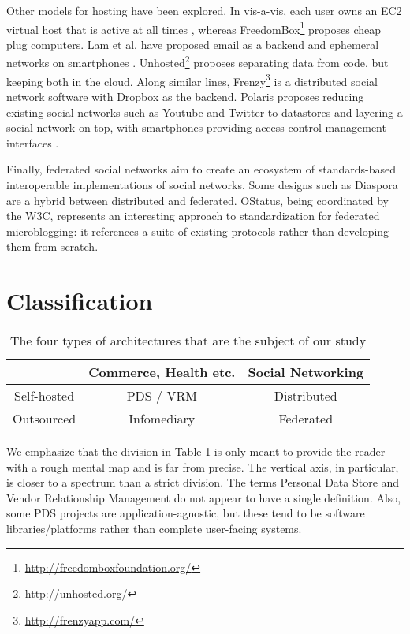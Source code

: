 \documentclass{acm_proc_article-sp}
\begin{document}
Other models for hosting have been explored. In vis-a-vis, each user owns an EC2 virtual host that is active at all times \cite{Shakimov_Lim_Li_Liu_Varshavsky_2011}, whereas FreedomBox\footnote{\url{http://freedomboxfoundation.org/}} proposes cheap plug computers. Lam et al. have proposed email as a backend \cite{Fischer_Lam_2011} and ephemeral networks on smartphones \cite{Dodson_Lam_2010}. Unhosted\footnote{\url{http://unhosted.org/}} proposes separating data from code, but keeping both in the cloud. Along similar lines, Frenzy\footnote{\url{http://frenzyapp.com/}} is a distributed social network software with Dropbox as the backend. Polaris proposes reducing existing social networks such as Youtube and Twitter to datastores and layering a social network on top, with smartphones providing access control management interfaces \cite{polaris}.

Finally, federated social networks aim to create an ecosystem of standards-based interoperable implementations of social networks. Some designs such as Diaspora are a hybrid between distributed and federated. OStatus, being coordinated by the W3C, represents an interesting approach to standardization for federated microblogging: it references a suite of existing protocols rather than developing them from scratch.


\section{Classification}
\label{sec:Classification}
\begin{table}[ht]
\caption{The four types of architectures that are the subject of our study} \label{label:results}
\centering \begin{tabular}{ |c | c| c |  }
\hline & Commerce, Health etc. & Social Networking\\
 \hline Self-hosted & PDS / VRM	& Distributed\\
\hline
Outsourced & Infomediary & Federated\\
\hline
\end{tabular}
\label{table:2x2} \end{table}



We emphasize that the division in Table \ref{table:2x2} is only meant to provide the reader with a rough mental map and is far from precise. The vertical axis, in particular, is closer to a spectrum than a strict division. The terms Personal Data Store and Vendor Relationship Management do not appear to have a single definition. Also, some PDS projects are application-agnostic, but these tend to be software libraries/platforms rather than complete user-facing systems.
\end{document}
